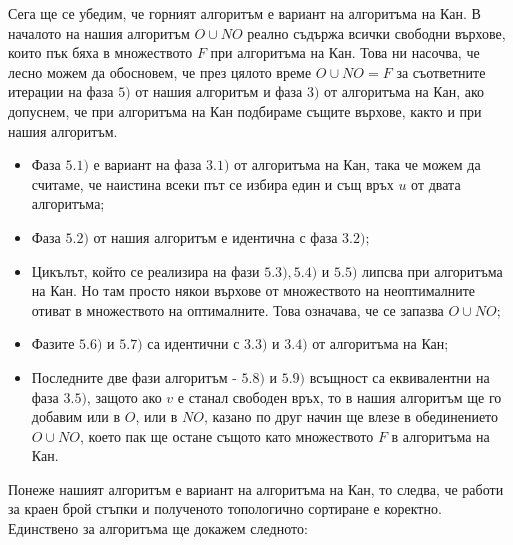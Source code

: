 \documentclass[12pt,twoside,a4paper]{article}
\begin{document}
	Сега ще се убедим, че горният алгоритъм е вариант на алгоритъма на Кан. В началото на нашия алгоритъм $O \cup NO$ реално съдържа всички свободни върхове, които пък бяха в множеството $F$ при алгоритъма на Кан. Това ни насочва, че лесно можем да обосновем, че през цялото време $O \cup NO = F$ за съответните итерации на фаза $5)$ от нашия алгоритъм и фаза $3)$ от алгоритъма на Кан, ако допуснем, че при алгоритъма на Кан подбираме същите върхове, както и при нашия алгоритъм.
	\begin{itemize}
		\item Фаза $5.1)$ е вариант на фаза $3.1)$ от алгоритъма на Кан, така че можем да считаме, че наистина всеки път се избира един и същ връх $u$ от двата алгоритъма;
		\item Фаза $5.2)$ от нашия алгоритъм е идентична с фаза $3.2)$;
		\item Цикълът, който се реализира на фази $5.3), 5.4)$ и $5.5)$ липсва при алгоритъма на Кан. Но там просто някои върхове от множеството на неоптималните отиват в множеството на оптималните. Това означава, че се запазва $O \cup NO$;
		\item Фазите $5.6)$ и $5.7)$ са идентични с $3.3)$ и $3.4)$ от алгоритъма на Кан;
		\item Последните две фази алгоритъм - $5.8)$ и $5.9)$ всъщност са еквивалентни на фаза $3.5)$, защото ако $v$ е станал свободен връх, то в нашия алгоритъм ще го добавим или в $O$, или в $NO$, казано по друг начин ще влезе в обединението $O \cup NO$, което пак ще остане същото като множеството $F$ в алгоритъма на Кан.
	\end{itemize}
	
	Понеже нашият алгоритъм е вариант на алгоритъма на Кан, то следва, че работи за краен брой стъпки и полученото топологично сортиране е коректно. Единствено за алгоритъма ще докажем следното:
	
\end{document}

